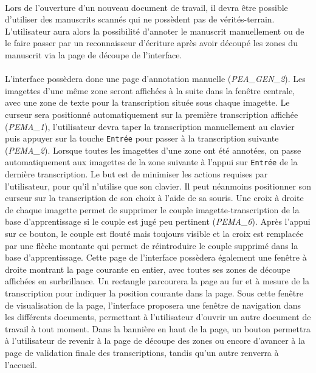 \paragraph{}
Lors de l’ouverture d’un nouveau document de travail, il devra être possible d’utiliser des manuscrits scannés qui ne possèdent pas de vérités-terrain. L’utilisateur aura alors la possibilité d’annoter le manuscrit manuellement ou de le faire passer par un reconnaisseur d’écriture après avoir découpé les zones du manuscrit via la page de découpe de l’interface.

\paragraph{}
L’interface possèdera donc une page d’annotation manuelle (\textit{PEA\_GEN\_2}). Les imagettes d’une même zone seront affichées à la suite dans la fenêtre centrale, avec une zone de texte pour la transcription située sous chaque imagette. Le curseur sera positionné automatiquement sur la première transcription affichée (\textit{PEMA\_1}), l’utilisateur devra taper la transcription manuellement au clavier puis appuyer sur la touche \texttt{Entrée} pour passer à la transcription suivante (\textit{PEMA\_2}). Lorsque toutes les imagettes d’une zone ont été annotées, on passe automatiquement aux imagettes de la zone suivante à l’appui sur \texttt{Entrée} de la dernière transcription. Le but est de minimiser les actions requises par l’utilisateur, pour qu’il n’utilise que son clavier. Il peut néanmoins positionner son curseur sur la transcription de son choix à l’aide de sa souris.
\newline{}
Une croix à droite de chaque imagette permet de supprimer le couple imagette-transcription de la base d’apprentissage si le couple est jugé peu pertinent (\textit{PEMA\_6}). Après l’appui sur ce bouton, le couple est flouté mais toujours visible et la croix est remplacée par une flèche montante qui permet de réintroduire le couple supprimé dans la base d’apprentissage.
\newline{}
Cette page de l’interface possèdera également une fenêtre à droite montrant la page courante en entier, avec toutes ses zones de découpe affichées en surbrillance. Un rectangle parcourera la page au fur et à mesure de la transcription pour indiquer la position courante dans la page.
\newline{}
Sous cette fenêtre de visualisation de la page, l’interface proposera une fenêtre de navigation dans les différents documents, permettant à l’utilisateur d’ouvrir un autre document de travail à tout moment.
\newline{}
Dans la bannière en haut de la page, un bouton permettra à l’utilisateur de revenir à la page de découpe des zones ou encore d’avancer à la page de validation finale des transcriptions, tandis qu’un autre renverra à l’accueil.

